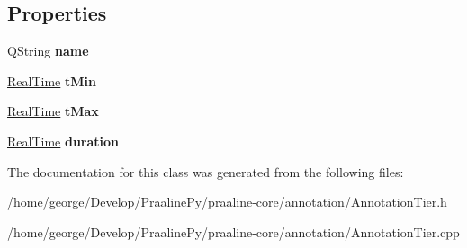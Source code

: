 \subsection*{Properties}
\begin{DoxyCompactItemize}
\item 
\mbox{\label{class_annotation_tier_a421ef99d21e002f1a5724c25ca016aa4}} 
Q\+String {\bfseries name}
\item 
\mbox{\label{class_annotation_tier_a20b9f0514d945098b014dafe7217cece}} 
\hyperlink{struct_real_time}{Real\+Time} {\bfseries t\+Min}
\item 
\mbox{\label{class_annotation_tier_a719a756eb98dfebebc0fb5fae78e45b6}} 
\hyperlink{struct_real_time}{Real\+Time} {\bfseries t\+Max}
\item 
\mbox{\label{class_annotation_tier_a67d00a5e50a49acc3dc43bb1d3652c7a}} 
\hyperlink{struct_real_time}{Real\+Time} {\bfseries duration}
\end{DoxyCompactItemize}


The documentation for this class was generated from the following files\+:\begin{DoxyCompactItemize}
\item 
/home/george/\+Develop/\+Praaline\+Py/praaline-\/core/annotation/Annotation\+Tier.\+h\item 
/home/george/\+Develop/\+Praaline\+Py/praaline-\/core/annotation/Annotation\+Tier.\+cpp\end{DoxyCompactItemize}
